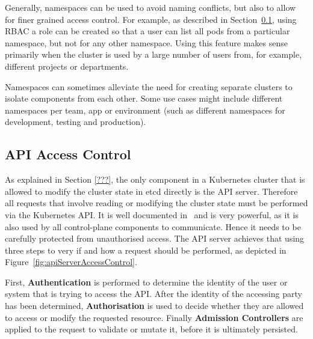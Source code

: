 Generally, namespaces can be used to avoid naming conflicts, but also to allow for finer grained access control. For example, as described in Section~\ref{sec:apiAccessControl}, using RBAC a role can be created so that a user can list all pods from a particular namespace, but not for any other namespace. Using this feature makes sense primarily when the cluster is used by a large number of users from, for example, different projects or departments. 

Namespaces can sometimes alleviate the need for creating separate clusters to isolate components from each other. Some use cases might include different namespaces per team, app or environment (such as different namespaces for development, testing and production). 


\subsection{API Access Control} \label{sec:apiAccessControl}

As explained in Section \ref{???}, the only component in a Kubernetes cluster that is allowed to modify the cluster state in etcd directly is the API server. Therefore all requests that involve reading or modifying the cluster state must be performed via the Kubernetes API. It is well documented in~\textcite{k8sdocsApi} and is very powerful, as it is also used by all control-plane components to communicate. Hence it needs to be carefully protected from unauthorised access. The API server achieves that using three steps to very if and how a request should be performed, as depicted in Figure~\ref{fig:apiServerAccessControl}.


First, \textbf{Authentication} is performed to determine the identity of the user or system that is trying to access the API. After the identity of the accessing party has been determined, \textbf{Authorisation} is used to decide whether they are allowed to access or modify the requested resource. Finally \textbf{Admission Controllers} are applied to the request to validate or mutate it, before it is ultimately persisted.

